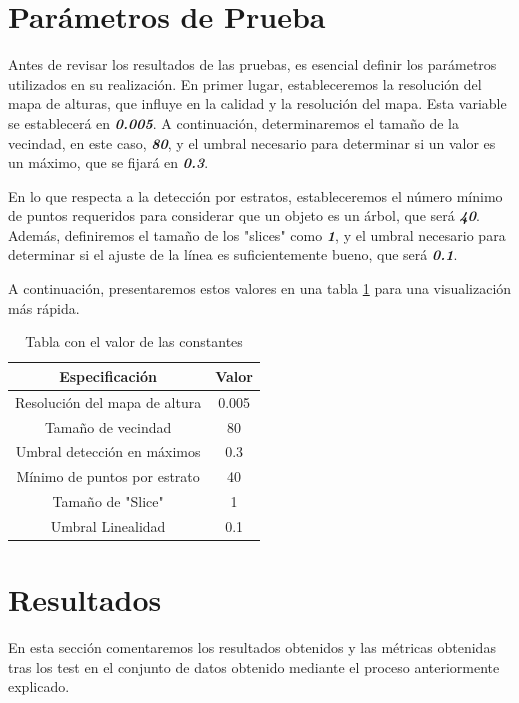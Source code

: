 \section{Parámetros de Prueba}

Antes de revisar los resultados de las pruebas, es esencial definir los parámetros utilizados en su realización. En primer lugar, estableceremos la resolución del mapa de alturas, que influye en la calidad y la resolución del mapa. Esta variable se establecerá en \textit{\textbf{0.005}}. A continuación, determinaremos el tamaño de la vecindad, en este caso, \textit{\textbf{80}}, y el umbral necesario para determinar si un valor es un máximo, que se fijará en \textit{\textbf{0.3}}.

En lo que respecta a la detección por estratos, estableceremos el número mínimo de puntos requeridos para considerar que un objeto es un árbol, que será \textit{\textbf{40}}. Además, definiremos el tamaño de los "slices" como \textit{\textbf{1}}, y el umbral necesario para determinar si el ajuste de la línea es suficientemente bueno, que será \textit{\textbf{0.1}}.

A continuación, presentaremos estos valores en una tabla \ref{tablavar} para una visualización más rápida.
\begin{table}[h]
\centering
{}
\begin{tabular}{c|c}
\rowcolor{udcpink!25}
\textbf{Especificación} & \textbf{Valor} \\\hline

Resolución del mapa de altura & 0.005 \\
Tamaño de vecindad & 80 \\
Umbral detección en máximos & 0.3 \\
Mínimo de puntos por estrato & 40 \\
Tamaño de "Slice" & 1 \\
Umbral Linealidad & 0.1 \\


\end{tabular}
\caption{Tabla con el valor de las constantes}
\label{tablavar}
\end{table}

\section{Resultados}
En esta sección comentaremos los resultados obtenidos y las métricas obtenidas tras los test en el conjunto de datos obtenido mediante el proceso anteriormente explicado.

